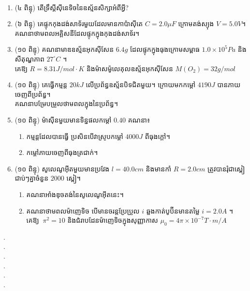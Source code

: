 \documentclass{officialexam}
\begin{document}
	\maketitle\\
	\begin{enumerate}[I]
		\item (៤ ពិន្ទុ) តើទ្រឹស្តីសុីនេទិចនៃឧស្ម័នសិក្សាអំពីអ្វី?
		\item (៦ ពិន្ទុ) គេផ្ទុកកុងដង់សាទ័រមួយដែលមានកាប៉ាសុីតេ $C=2.0\mu F$ ក្រោមតង់ស្យុង $V=5.0V$។\\ គណនាថាមពលអគ្គិសនីដែលផ្ទុកក្នុងកុងដង់សាទ័រ។
		\item (១០ ពិន្ទុ) គណនាមាឌឧស្ម័នអុកសុីសែន $6.4g$ ដែលផ្ទុកក្នុងធុងក្រោមសម្ពាធ $1.0\times10^{5}Pa$ និងសីតុណ្ហភាព $27^\circ C$ ។ \\គេឱ្យ $R=8.31J/mol\cdot K$ និងម៉ាសម៉ូលេគុលឧស្ម័នអុកសុីសែន $M(O_2)=32g/mol$
		\item (១០ ពិន្ទុ) គេធ្វើកម្មន្ត $20kJ$ លើប្រព័ន្ធឧស្ម័នបិទជិតមួយ។ ក្រោយមកកម្តៅ $4190J$ បានភាយចេញពីប្រព័ន្ធ។ \\គណនាបម្រែបម្រួលថាមពលក្នុងនៃប្រព័ន្ធ។
		\item (១០ ពិន្ទុ) ម៉ាសុីនមួយមានទិន្នផលកម្តៅ $0.40$ គណនា៖
		\begin{enumerate}[k]
			\item កម្មន្តដែលបានធ្វើ ប្រសិនបើវាស្រូបកម្ដៅ $4000J$ ពីធុងក្តៅ។
			\item កម្តៅភាយចេញពីធុងត្រជាក់។
		\end{enumerate} 
		\item (១០ ពិន្ទុ) សូលេណូអុីតមួយមានប្រវែង $l=40.0cm$ និងមានកាំ $R=2.0cm$ ត្រូវបានរុំជា​​ស្ពៀ​​​​ជាប់ៗ​​គ្នាចំនួន $2000$ ស្ពៀ។
		\begin{enumerate}[k]
			\item គណនាអាំងឌុចតង់នៃសូលេណូអុីតនេះ។
			\item គណនាថាមពលម៉ាញេទិច បើមានចរន្តប្រែប្រួល $i$ ឆ្លងកាត់បូប៊ីនមានតម្លៃ $i=2.0A$ ។\\ គេឱ្យ $~\pi^2=10$ និងជំរាបដែនម៉ាញេទិចក្នុងសុញ្ញាកាស $\mu_0=4\pi\times10^{-7}T\cdot m/A$
		\end{enumerate} 
	\end{enumerate}
{\color{white}.}\dotfill\\
{\color{white}.}\dotfill\\
{\color{white}.}\dotfill\\
{\color{white}.}\dotfill\\
{\color{white}.}\dotfill\\
{\color{white}.}\dotfill\\
\end{document}
